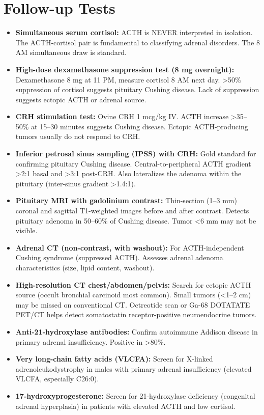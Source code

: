 \section*{Follow-up Tests}
\begin{itemize}
  \item \textbf{Simultaneous serum cortisol:} ACTH is NEVER interpreted in isolation. The ACTH-cortisol pair is fundamental to classifying adrenal disorders. The 8 AM simultaneous draw is standard.
  \item \textbf{High-dose dexamethasone suppression test (8 mg overnight):} Dexamethasone 8 mg at 11 PM, measure cortisol 8 AM next day. >50\% suppression of cortisol suggests pituitary Cushing disease. Lack of suppression suggests ectopic ACTH or adrenal source.
  \item \textbf{CRH stimulation test:} Ovine CRH 1 mcg/kg IV. ACTH increase >35--50\% at 15--30 minutes suggests Cushing disease. Ectopic ACTH-producing tumors usually do not respond to CRH.
  \item \textbf{Inferior petrosal sinus sampling (IPSS) with CRH:} Gold standard for confirming pituitary Cushing disease. Central-to-peripheral ACTH gradient >2:1 basal and >3:1 post-CRH. Also lateralizes the adenoma within the pituitary (inter-sinus gradient >1.4:1).
  \item \textbf{Pituitary MRI with gadolinium contrast:} Thin-section (1--3 mm) coronal and sagittal T1-weighted images before and after contrast. Detects pituitary adenoma in 50--60\% of Cushing disease. Tumor <6 mm may not be visible.
  \item \textbf{Adrenal CT (non-contrast, with washout):} For ACTH-independent Cushing syndrome (suppressed ACTH). Assesses adrenal adenoma characteristics (size, lipid content, washout).
  \item \textbf{High-resolution CT chest/abdomen/pelvis:} Search for ectopic ACTH source (occult bronchial carcinoid most common). Small tumors (<1--2 cm) may be missed on conventional CT. Octreotide scan or Ga-68 DOTATATE PET/CT helps detect somatostatin receptor-positive neuroendocrine tumors.
  \item \textbf{Anti-21-hydroxylase antibodies:} Confirm autoimmune Addison disease in primary adrenal insufficiency. Positive in >80\%.
  \item \textbf{Very long-chain fatty acids (VLCFA):} Screen for X-linked adrenoleukodystrophy in males with primary adrenal insufficiency (elevated VLCFA, especially C26:0).
  \item \textbf{17-hydroxyprogesterone:} Screen for 21-hydroxylase deficiency (congenital adrenal hyperplasia) in patients with elevated ACTH and low cortisol.
\end{itemize}

